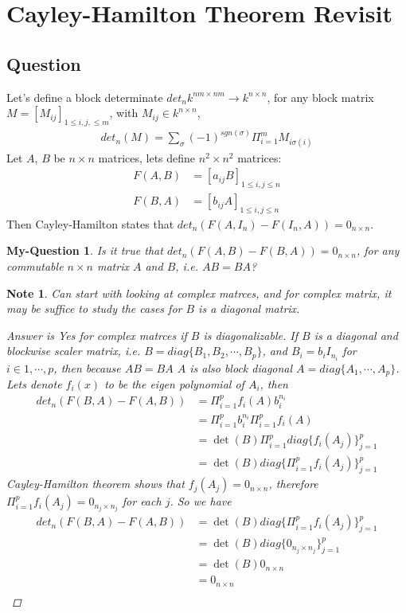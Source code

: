 \documentclass[pdf]{article}
\newtheorem{note}[theorem]{Note}
\newtheorem{myQuestion}[theorem]{My-Question}
\begin{document}
\section{Cayley-Hamilton Theorem Revisit}

\subsection{Question}
Let's define a block determinate $det_n k^{nm\times nm} \to k^{n\times n}$, for any block matrix $M = [M_{ij}]_{1\leq i, j, \leq m}$, with $M_{ij}\in k^{n\times n}$,
\begin{align*}
det_n(M) = \sum\limits_\sigma (-1)^{sgn(\sigma)}\Pi_{i=1}^mM_{i\sigma(i)}
\end{align*}
Let $A$, $B$ be $n\times n$ matrices, lets define $n^2\times n^2$ matrices:
\begin{align*}
F(A,B) &= [a_{ij}B]_{1\leq i, j \leq n}\\
F(B,A) &= [b_{ij}A]_{1\leq i, j \leq n}
\end{align*}
Then Cayley-Hamilton states that $det_n(F(A,I_n) - F(I_n,A)) = 0_{n\times n}$.\\
\begin{myQuestion}\label{general_CH_Thm}
Is it true that $det_n(F(A,B) - F(B,A)) = 0_{n\times n}$, for any commutable $n\times n$ matrix $A$ and $B$, i.e. $AB=BA$?
\end{myQuestion}
\begin{note}
	Can start with looking at complex matrces, and for complex matrix, it may be suffice to study the cases for $B$ is a diagonal matrix.
	\begin{proof}[Answer is Yes for complex matrces if $B$ is diagonalizable]
		If $B$ is a diagonal and blockwise scaler matrix, i.e. $B =  diag\{B_1, B_2, \cdots, B_p\}$, and $B_i = b_i I_{n_i}$ for $i\in 1,\cdots,p$, then because $AB=BA$ $A$ is also block diagonal $A = diag\{A_1,\cdots,A_p\}$. Lets denote $f_i(x)$ to be the eigen polynomial of $A_i$, then 
	\begin{align*}
		det_n(F(B,A) - F(A,B) ) &= \Pi_{i=1}^pf_i(A)b_i^{n_i}\\
					      &= \Pi_{i=1}^pb_i^{n_i}\Pi_{i=1}^pf_i(A)\\
					      &= \det(B)\Pi_{i=1}^p diag\{f_i(A_j)\}_{j=1}^p\\
					      &= \det(B) diag\{\Pi_{i=1}^pf_i(A_j)\}_{j=1}^p
	\end{align*}
	Cayley-Hamilton theorem shows that $f_j(A_j) = 0_{n\times n}$, therefore $\Pi_{i=1}^pf_i(A_j) = 0_{n_j\times n_j}$ for each $j$. So we have
	\begin{align*}
		det_n(F(B,A) - F(A,B) ) &= \det(B) diag\{\Pi_{i=1}^pf_i(A_j)\}_{j=1}^p\\
					      &= \det(B) diag\{0_{n_j\times n_j}\}_{j=1}^p\\
					      &= \det(B) 0_{n\times n}\\
					      &= 0_{n\times n}\\
	\end{align*}
	\end{proof}
\end{note}
\end{document}
